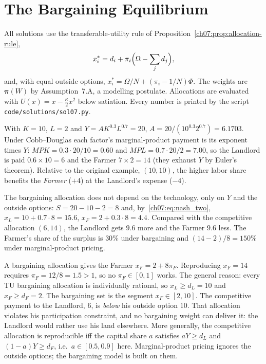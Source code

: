\documentclass[../solutions_manual.tex]{subfiles}
\begin{document}
\ifSubfilesClassLoaded{\setcounter{chapter}{6}}{}%
\setcounter{chapter}{6}%
\chapter{The Bargaining Equilibrium}\label{sol07}

All solutions use the transferable-utility rule of Proposition~\ref{ch07:prop:allocation-rule},
\[
x_i^* = d_i + \pi_i\Bigl(\Omega - \sum_j d_j\Bigr),
\]
and, with equal outside options, $x_i^* = \Omega/N + (\pi_i - 1/N)\Phi$. The weights are $\boldsymbol{\pi}(W)$ by Assumption~7.A, a modelling postulate. Allocations are evaluated with $U(x) = x - \frac{\kappa}{2}x^2$ below satiation. Every number is printed by the script \nolinkurl{code/solutions/sol07.py}.


 With $K = 10$, $L = 2$ and $Y = AK^{0.3}L^{0.7} = 20$, $A = 20/(10^{0.3}2^{0.7}) = 6.1703$. Under Cobb--Douglas each factor's marginal-product payment is its exponent times $Y$: $MPK = 0.3\cdot 20/10 = 0.60$ and $MPL = 0.7\cdot 20/2 = 7.00$, so the Landlord is paid $0.6 \times 10 = 6$ and the Farmer $7 \times 2 = 14$ (they exhaust $Y$ by Euler's theorem). Relative to the original example, $(10, 10)$, the higher labor share benefits the \emph{Farmer} ($+4$) at the Landlord's expense ($-4$).

 The bargaining allocation does not depend on the technology, only on $Y$ and the outside options: $S = 20 - 10 - 2 = 8$ and, by~\eqref{ch07:eq:nash_two}, $x_L = 10 + 0.7\cdot 8 = 15.6$, $x_F = 2 + 0.3\cdot 8 = 4.4$. Compared with the competitive allocation $(6, 14)$, the Landlord gets $9.6$ more and the Farmer $9.6$ less. The Farmer's share of the surplus is $30\%$ under bargaining and $(14-2)/8 = 150\%$ under marginal-product pricing.

 A bargaining allocation gives the Farmer $x_F = 2 + 8\pi_F$. Reproducing $x_F = 14$ requires $\pi_F = 12/8 = 1.5 > 1$, so no $\pi_F \in [0,1]$ works. The general reason: every TU bargaining allocation is individually rational, so $x_L \ge d_L = 10$ and $x_F \ge d_F = 2$. The bargaining set is the segment $x_F \in [2, 10]$. The competitive payment to the Landlord, $6$, is \emph{below} his outside option $10$. That allocation violates his participation constraint, and no bargaining weight can deliver it: the Landlord would rather use his land elsewhere. More generally, the competitive allocation is reproducible iff the capital share $a$ satisfies $aY \ge d_L$ and $(1-a)Y \ge d_F$, i.e.\ $a \in [0.5, 0.9]$ here. Marginal-product pricing ignores the outside options; the bargaining model is built on them.
\end{document}
